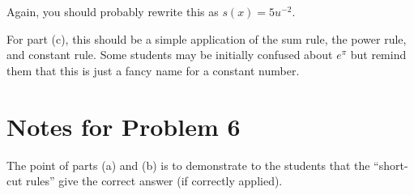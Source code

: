 \documentclass[handout,nooutcomes]{ximera}
\begin{document}
Again, you should probably rewrite this as $s(x) = 5u^{−2}$.

For part (c), this should be a simple application of the sum rule, the power rule, and constant rule.
Some students may be initially confused about $e^\pi$ but remind them that this is just a fancy name for a constant number.

\section{Notes for Problem 6}
The point of parts (a) and (b) is to demonstrate to the students that the ``short-cut rules'' give the correct answer (if correctly applied).
\end{document}
